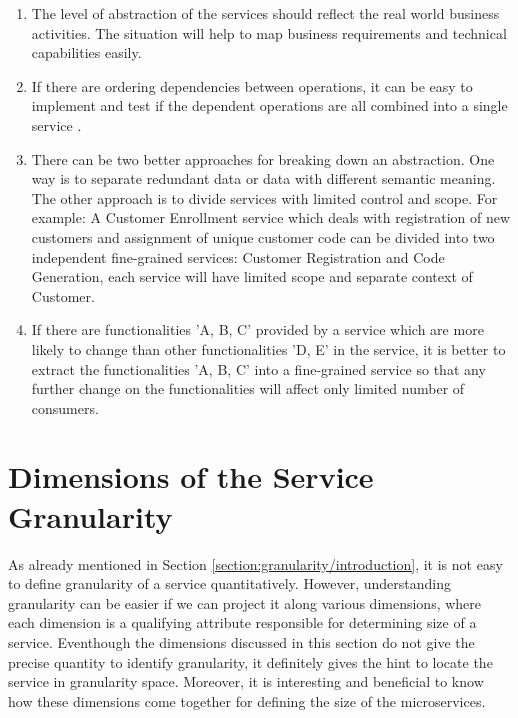 \begin{enumerate}
\item The level of abstraction of the services should reflect the real world business activities. The situation will help to map business requirements and technical capabilities easily. \cite{Pierre-Reldin:2007aa}

\item If there are ordering dependencies between operations, it can be easy to implement and test if the dependent operations are all combined into a single service \cite{Bianco:2007aa}.

\item There can be two better approaches for breaking down an abstraction. One way is to separate redundant data or data with different semantic meaning. The other approach is to divide services with limited control and scope. For example: A Customer Enrollment service which deals with registration of new customers and assignment of unique customer code can be divided into two independent fine-grained services: Customer Registration and Code Generation, each service will have limited scope and separate context of Customer.\cite{Pierre-Reldin:2007aa}

\item If there are functionalities 'A, B, C' provided by a service which are more likely to change than other functionalities 'D, E' in the service, it is better to extract the functionalities 'A, B, C' into a fine-grained service so that any further change on the functionalities will affect only limited number of consumers. \cite{Bianco:2007aa}
 
\end{enumerate}

\section{Dimensions of the Service Granularity}\label{section:granularity/dimensions}
As already mentioned in Section \ref{section:granularity/introduction}, it is not easy to define granularity of a service quantitatively. However, understanding granularity can be easier if we can project it along various dimensions, where each dimension is a qualifying attribute responsible for determining size of a service. Eventhough the  dimensions discussed in this section do not give the precise quantity to identify granularity, it definitely gives the hint to locate the service in granularity space. Moreover, it is interesting and beneficial to know how these dimensions come together for defining the size of the microservices.

